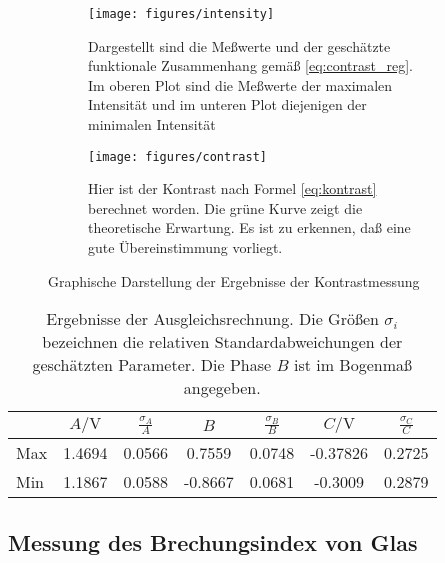 \begin{figure}
  \centering
  
  \begin{subfigure}{0.8\textwidth}
    \texttt{[image: figures/intensity]}
    \caption{Dargestellt sind die Meßwerte und der geschätzte
      funktionale Zusammenhang gemäß \cref{eq:contrast_reg}.  Im oberen
      Plot sind die Meßwerte der maximalen Intensität und im unteren
      Plot diejenigen der minimalen Intensität}
    \label{fig:intensity}
  \end{subfigure}
  \vspace{5mm}

  \begin{subfigure}{0.8\textwidth}
    \texttt{[image: figures/contrast]}
    \caption{Hier ist der Kontrast nach Formel \eqref{eq:kontrast}
      berechnet worden.  Die grüne Kurve zeigt die theoretische
      Erwartung.  Es ist zu erkennen, daß eine gute Übereinstimmung
      vorliegt.}
    \label{fig:contrast}
  \end{subfigure}

  \caption{Graphische Darstellung der Ergebnisse der Kontrastmessung}
\end{figure}

\begin{table}
  \centering
  \begin{tabular}{lSSSSSS}
    \toprule
    & 
    {$A/\si{\volt}$} & {$\frac{\sigma_A}{A}$} &
    {$B$} & {$\frac{\sigma_B}{B}$} &
    {$C/\si{\volt}$} & {$\frac{\sigma_C}{C}$} \\
    \midrule
    Max &
    1.4694 & 0.0566 & 0.7559 & 0.0748 & -0.37826 & 0.2725 \\
    Min &
    1.1867 & 0.0588 & -0.8667 & 0.0681 & -0.3009 & 0.2879\\
    \bottomrule
  \end{tabular}
  \caption{Ergebnisse der Ausgleichsrechnung.  Die Größen $\sigma_i$
    bezeichnen die relativen Standardabweichungen der geschätzten 
    Parameter.  Die Phase $B$ ist im Bogenmaß angegeben.}
  \label{tab:intensity}
\end{table}

\subsection{Messung des Brechungsindex von Glas}

